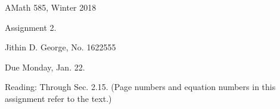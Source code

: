 \documentclass[letterpaper,12pt]{article}
\begin{document}




\noindent
{\scriptsize AMath 585, Winter 2018} \hfill 

\begin{center}
\large
Assignment 2. 
\normalsize

Jithin D. George, No. 1622555

\end{center}
\noindent
Due Monday, Jan. 22.
\vspace{.3in}





\noindent
Reading:  Through Sec. 2.15.  (Page numbers and equation numbers in this 
assignment refer to the text.)
\vspace{.5cm}
\end{document}

